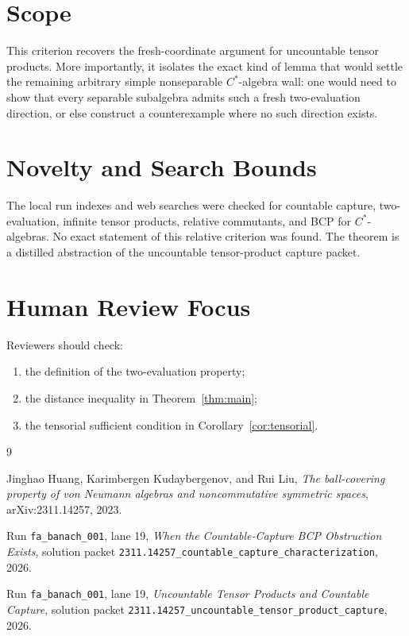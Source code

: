 \documentclass[11pt]{article}
\begin{document}
\section*{Scope}

This criterion recovers the fresh-coordinate argument for uncountable tensor
products.  More importantly, it isolates the exact kind of lemma that would
settle the remaining arbitrary simple nonseparable \(C^*\)-algebra wall: one
would need to show that every separable subalgebra admits such a fresh
two-evaluation direction, or else construct a counterexample where no such
direction exists.

\section*{Novelty and Search Bounds}

The local run indexes and web searches were checked for countable capture,
two-evaluation, infinite tensor products, relative commutants, and BCP for
\(C^*\)-algebras.  No exact statement of this relative criterion was found.
The theorem is a distilled abstraction of the uncountable tensor-product
capture packet.

\section*{Human Review Focus}

Reviewers should check:
\begin{enumerate}
    \item the definition of the two-evaluation property;
    \item the distance inequality in Theorem~\ref{thm:main};
    \item the tensorial sufficient condition in Corollary~\ref{cor:tensorial}.
\end{enumerate}

\begin{thebibliography}{9}

Jinghao Huang, Karimbergen Kudaybergenov, and Rui Liu,
\emph{The ball-covering property of von Neumann algebras and noncommutative
symmetric spaces},
arXiv:2311.14257, 2023.

Run \texttt{fa\_banach\_001}, lane 19,
\emph{When the Countable-Capture BCP Obstruction Exists},
solution packet
\texttt{2311.14257\_countable\_capture\_characterization}, 2026.

Run \texttt{fa\_banach\_001}, lane 19,
\emph{Uncountable Tensor Products and Countable Capture},
solution packet
\texttt{2311.14257\_uncountable\_tensor\_product\_capture}, 2026.

\end{thebibliography}
\end{document}
